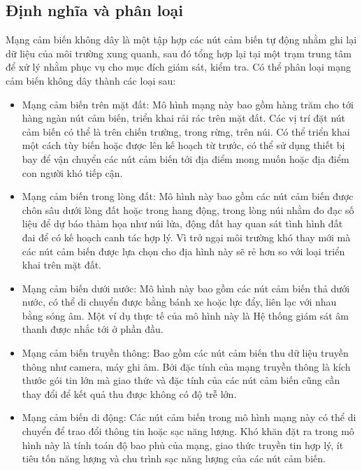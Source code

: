 \subsection{Định nghĩa và phân loại}
Mạng cảm biến không dây là một tập hợp các nút cảm biến tự động nhằm ghi lại dữ liệu của môi trường xung quanh, sau đó tổng hợp lại tại một trạm trung tâm để xử lý nhằm phục vụ cho mục đích giám sát, kiểm tra.
\linebreak
\cite{wsn_types} Có thể phân loại mạng cảm biến không dây thành các loại sau:
\begin{itemize}
\item Mạng cảm biến trên mặt đất: Mô hình mạng này bao gồm hàng trăm cho tới hàng ngàn nút cảm biến, triển khai rải rác trên mặt đất. Các vị trí đặt nút cảm biến có thể là trên chiến trường, trong rừng, trên núi. Có thể triển khai một cách tùy biến hoặc được lên kế hoạch từ trước, có thể sử dụng thiết bị bay để vận chuyển các nút cảm biến tới địa điểm mong muốn hoặc địa điểm con người khó tiếp cận.
\item Mạng cảm biến trong lòng đất: Mô hình này bao gồm các nút cảm biến được chôn sâu dưới lòng đất hoặc trong hang động, trong lòng núi nhằm đo đạc số liệu để dự báo thảm họa như núi lửa, động đất hay quan sát tình hình đất đai để có kế hoạch canh tác hợp lý. Vì trở ngại môi trường khó thay mới mà các nút cảm biến được lựa chọn cho địa hình này sẽ rẻ hơn so với loại triển khai trên mặt đất. 
\item Mạng cảm biến dưới nước: Mô hình này bao gồm các nút cảm biến thả dưới nước, có thể di chuyển được bằng bánh xe hoặc lực đẩy, liên lạc với nhau bằng sóng âm. Một ví dụ thực tế của mô hình này là Hệ thống giám sát âm thanh được nhắc tới ở phần đầu.
\item Mạng cảm biến truyền thông: Bao gồm các nút cảm biến thu dữ liệu truyền thông như camera, máy ghi âm. Bởi đặc tính của mạng truyền thông là kích thước gói tin lớn mà giao thức và đặc tính của các nút cảm biến cũng cần thay đổi để kết quả thu được không có độ trễ lớn. 
\item Mạng cảm biến di động: Các nút cảm biến trong mô hình mạng này có thể di chuyển để trao đổi thông tin hoặc sạc năng lượng. Khó khăn đặt ra trong mô hình này là tính toán độ bao phủ của mạng, giao thức truyền tin hợp lý, ít tiêu tốn năng lượng và chu trình sạc năng lượng của các nút cảm biến.
\end{itemize}
 
